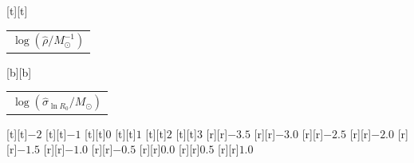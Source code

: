 %    
%
%
\begin{psfrags}%
\psfragscanon%
%
[t][t]{\color[rgb]{0,0,0}\setlength{\tabcolsep}{0pt}\begin{tabular}{c}{\Large$\log\left(\hat{\rho}/M_\odot^{-1}\right)$}\end{tabular}}%
[b][b]{\color[rgb]{0,0,0}\setlength{\tabcolsep}{0pt}\begin{tabular}{c}{\Large$\log\left(\hat{\sigma}_{\ln R_0}/M_\odot\right)$}\end{tabular}}%
%
[t][t]{$-2$}%
[t][t]{$-1$}%
[t][t]{$0$}%
[t][t]{$1$}%
[t][t]{$2$}%
[t][t]{$3$}%
%
[r][r]{$-3.5$}%
[r][r]{$-3.0$}%
[r][r]{$-2.5$}%
[r][r]{$-2.0$}%
[r][r]{$-1.5$}%
[r][r]{$-1.0$}%
[r][r]{$-0.5$}%
[r][r]{$0.0$}%
[r][r]{$0.5$}%
[r][r]{$1.0$}%
%
%
\end{psfrags}%
%
